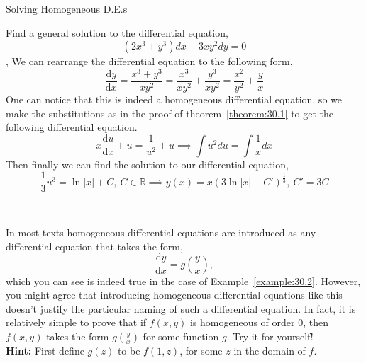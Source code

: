\begin{example}{Solving Homogeneous D.E.s}\label{example:30.2}

Find a general solution to the differential equation,
$$(2x^3+y^3)dx-3xy^2dy=0$$
\sep
We can rearrange the differential equation to the following form,
$$\frac{\mathrm{d}y}{\mathrm{d}x}=\frac{x^3+y^3}{xy^2}=\frac{x^3}{xy^2}+\frac{y^3}{xy^2}=\frac{x^2}{y^2}+\frac{y}{x}$$
One can notice that this is indeed a homogeneous differential equation, so we make the substitutions as in the proof of theorem~\ref{theorem:30.1} to get the following differential equation.
$$x\frac{\mathrm{d}u}{\mathrm{d}x}+u=\frac{1}{u^2}+u \implies \int u^2 du=\int \frac{1}{x} dx$$
Then finally we can find the solution to our differential equation,
$$\frac{1}{3}u^3= \ln|x|+C, \ C \in \mathbb{R} \implies y(x)=x \left(3 \ln|x|+C' \right)^\frac{1}{3}, \ C'=3C$$
\end{example}
\begin{insight}{~}

In most texts homogeneous differential equations are introduced as any differential equation that takes the form,
$$\frac{\mathrm{d}y}{\mathrm{d}x}=g\left(\frac{y}{x}\right),$$
which you can see is indeed true in the case of Example~\ref{example:30.2}. However, you might agree that introducing homogeneous differential equations like this doesn't justify the particular naming of such a differential equation. In fact, it is relatively simple to prove that if $f(x,y)$ is homogeneous of order $0$, then $f(x,y)$ takes the form $g\left(\frac{y}{x}\right)$ for some function $g$. Try it for yourself! \\
\textbf{Hint:} First define $g(z)$ to be $f(1,z)$, for some $z$ in the domain of $f$.

\end{insight}

\newpage

